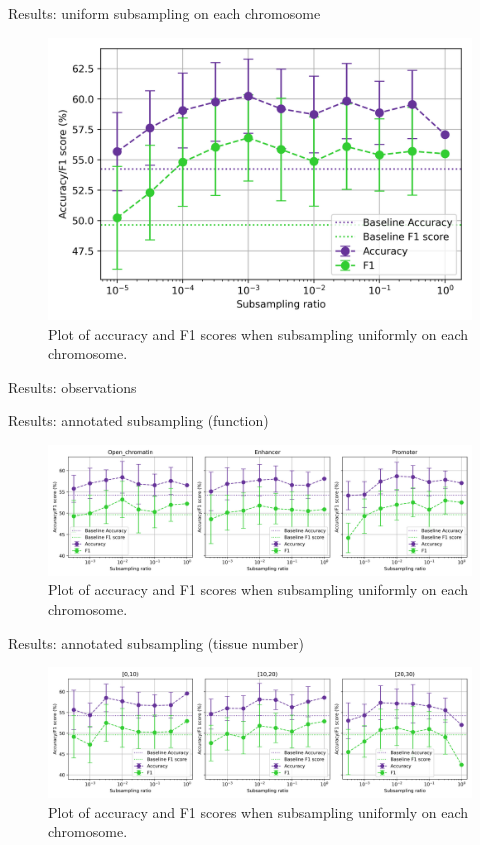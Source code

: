 \documentclass[aspectratio=169]{beamer}
\begin{document}
\begin{frame}{Results: uniform subsampling on each chromosome}
\begin{figure}[H]
    \centering
    \includegraphics[height=0.5\textwidth]{../figures/uniform_sample_low_ratio.png}
    \caption{Plot of accuracy and F1 scores when subsampling uniformly on each chromosome.}
    \label{fig:res1b}
\end{figure}
\end{frame}

\begin{frame}{Results: observations}
\end{frame}

\begin{frame}{Results: annotated subsampling (function)}
\begin{figure}[H]
    \centering
    \includegraphics[width=\textwidth]{../figures/subsample_annotated.png}
    \caption{Plot of accuracy and F1 scores when subsampling uniformly on each chromosome.}
    \label{fig:res1a}
\end{figure}
\end{frame}

\begin{frame}{Results: annotated subsampling (tissue number)}
\begin{figure}[H]
    \centering
    \includegraphics[width=\textwidth]{../figures/subsample_ntissue.png}
    \caption{Plot of accuracy and F1 scores when subsampling uniformly on each chromosome.}
    \label{fig:res2b}
\end{figure}
\end{frame}
\end{document}
